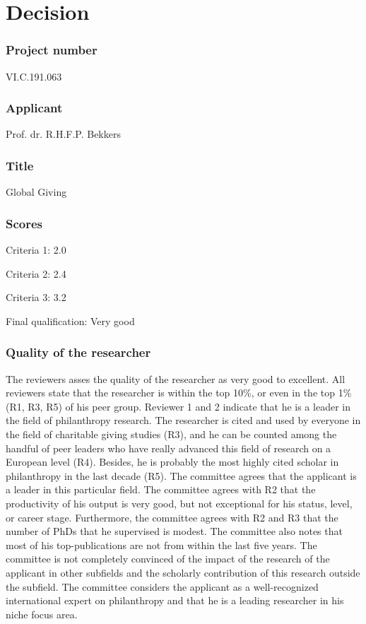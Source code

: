\documentclass[twocolumn, serif, rga, numeric]{jote-article}
\begin{document}
 {}\section*{Decision} 
 {}\subsubsection*{Project number} 
VI.C.191.063
 {}\subsubsection*{Applicant} 
Prof. dr. R.H.F.P. Bekkers
 {}\subsubsection*{Title} 
Global Giving
 {}\subsubsection*{Scores} 
Criteria 1: 2.0

\noindent Criteria 2: 2.4

\noindent Criteria 3: 3.2

\noindent Final qualification: Very good

 {}\subsubsection*{Quality of the researcher} 

The reviewers asses the quality of the researcher as very good to excellent. All reviewers state that the researcher is within the top 10\%, or even in the top 1\% (R1, R3, R5) of his peer group. Reviewer 1 and 2 indicate that he is a leader in the field of philanthropy research. The researcher is cited and used by everyone in the field of charitable giving studies (R3), and he can be counted among the handful of peer leaders who have really advanced this field of research on a European level (R4). Besides, he is probably the most highly cited scholar in philanthropy in the last decade (R5). The committee agrees that the applicant is a leader in this particular field. The committee agrees with R2 that the productivity of his output is very good, but not exceptional for his status, level, or career stage. Furthermore, the committee agrees with R2 and R3 that the number of PhDs that he supervised is modest. The committee also notes that most of his top-publications are not from within the last five years. The committee is not completely convinced of the impact of the research of the applicant in other subfields and the scholarly contribution of this research outside the subfield. The committee considers the applicant as a well-recognized international expert on philanthropy and that he is a leading researcher in his niche focus area.
\end{document}
